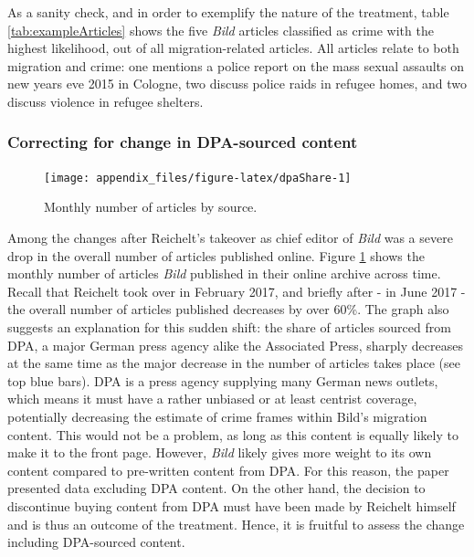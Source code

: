 \documentclass[
]{article}
\begin{document}
As a sanity check, and in order to exemplify the nature of the treatment, table \ref{tab:exampleArticles} shows the five \emph{Bild} articles classified as crime with the highest likelihood, out of all migration-related articles. All articles relate to both migration and crime: one mentions a police report on the mass sexual assaults on new years eve 2015 in Cologne, two discuss police raids in refugee homes, and two discuss violence in refugee shelters.

\pagebreak

\hypertarget{correcting-for-change-in-dpa-sourced-content}{%
\subsubsection{Correcting for change in DPA-sourced content}\label{correcting-for-change-in-dpa-sourced-content}}

\begin{figure}[!htp]

{\centering \texttt{[image: appendix\_files/figure-latex/dpaShare-1]} 

}

\caption{Monthly number of articles by source.}\label{fig:dpaShare}
\end{figure}

Among the changes after Reichelt's takeover as chief editor of \emph{Bild} was a severe drop in the overall number of articles published online. Figure \ref{fig:dpaShare} shows the monthly number of articles \emph{Bild} published in their online archive across time. Recall that Reichelt took over in February 2017, and briefly after - in June 2017 - the overall number of articles published decreases by over 60\%. The graph also suggests an explanation for this sudden shift: the share of articles sourced from DPA, a major German press agency alike the Associated Press, sharply decreases at the same time as the major decrease in the number of articles takes place (see top blue bars). DPA is a press agency supplying many German news outlets, which means it must have a rather unbiased or at least centrist coverage, potentially decreasing the estimate of crime frames within Bild's migration content. This would not be a problem, as long as this content is equally likely to make it to the front page. However, \emph{Bild} likely gives more weight to its own content compared to pre-written content from DPA. For this reason, the paper presented data excluding DPA content. On the other hand, the decision to discontinue buying content from DPA must have been made by Reichelt himself and is thus an outcome of the treatment. Hence, it is fruitful to assess the change including DPA-sourced content.
\end{document}

